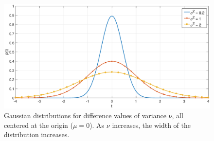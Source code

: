 \documentclass[12pt]{article}
\newcommand{\blurV}{\nu}	%
\begin{document}
\begin{figure}
	\centerline{\includegraphics[scale=0.4]{Figures/GaussianDistributions.eps}}
\caption{Gaussian distributions for difference values of variance $\blurV$, all centered at the origin ($\mu = 0$). As $\blurV$ increases, the width of the distribution increases.}
\label{GaussianDistributions}
\end{figure}
\end{document}
